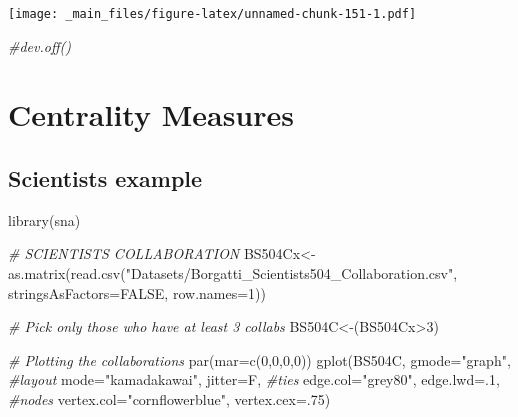 \documentclass[
  notitlepage,
  onecolumn,
  openany]{book}
\newenvironment{Shaded}{\begin{snugshade}}{\end{snugshade}}
\newcommand{\AttributeTok}[1]{\textcolor[rgb]{0.77,0.63,0.00}{#1}}
\newcommand{\CommentTok}[1]{\textcolor[rgb]{0.56,0.35,0.01}{\textit{#1}}}
\newcommand{\ConstantTok}[1]{\textcolor[rgb]{0.00,0.00,0.00}{#1}}
\newcommand{\DecValTok}[1]{\textcolor[rgb]{0.00,0.00,0.81}{#1}}
\newcommand{\FunctionTok}[1]{\textcolor[rgb]{0.00,0.00,0.00}{#1}}
\newcommand{\NormalTok}[1]{#1}
\newcommand{\OtherTok}[1]{\textcolor[rgb]{0.56,0.35,0.01}{#1}}
\newcommand{\SpecialCharTok}[1]{\textcolor[rgb]{0.00,0.00,0.00}{#1}}
\newcommand{\StringTok}[1]{\textcolor[rgb]{0.31,0.60,0.02}{#1}}
\begin{document}
\texttt{[image: \_main\_files/figure-latex/unnamed-chunk-151-1.pdf]}

\begin{Shaded}
\begin{Highlighting}[]
\CommentTok{\#dev.off()}
\end{Highlighting}
\end{Shaded}

\hypertarget{centrality-measures}{%
\chapter{Centrality Measures}\label{centrality-measures}}

\hypertarget{scientists-example}{%
\section{Scientists example}\label{scientists-example}}

\begin{Shaded}
\begin{Highlighting}[]
\FunctionTok{library}\NormalTok{(sna)}

\CommentTok{\# SCIENTISTS COLLABORATION}
\NormalTok{BS504Cx}\OtherTok{\textless{}{-}}\FunctionTok{as.matrix}\NormalTok{(}\FunctionTok{read.csv}\NormalTok{(}\StringTok{"Datasets/Borgatti\_Scientists504\_Collaboration.csv"}\NormalTok{,}
                            \AttributeTok{stringsAsFactors=}\ConstantTok{FALSE}\NormalTok{, }\AttributeTok{row.names=}\DecValTok{1}\NormalTok{))}

\CommentTok{\# Pick only those who have at least 3 collabs}
\NormalTok{BS504C}\OtherTok{\textless{}{-}}\NormalTok{(BS504Cx}\SpecialCharTok{\textgreater{}}\DecValTok{3}\NormalTok{)}

\CommentTok{\# Plotting the collaborations}
\FunctionTok{par}\NormalTok{(}\AttributeTok{mar=}\FunctionTok{c}\NormalTok{(}\DecValTok{0}\NormalTok{,}\DecValTok{0}\NormalTok{,}\DecValTok{0}\NormalTok{,}\DecValTok{0}\NormalTok{))}
\FunctionTok{gplot}\NormalTok{(BS504C, }
      \AttributeTok{gmode=}\StringTok{"graph"}\NormalTok{,}
      \CommentTok{\#layout}
      \AttributeTok{mode=}\StringTok{"kamadakawai"}\NormalTok{,}
      \AttributeTok{jitter=}\NormalTok{F,}
      \CommentTok{\#ties}
      \AttributeTok{edge.col=}\StringTok{"grey80"}\NormalTok{, }
      \AttributeTok{edge.lwd=}\NormalTok{.}\DecValTok{1}\NormalTok{,}
      \CommentTok{\#nodes}
      \AttributeTok{vertex.col=}\StringTok{"cornflowerblue"}\NormalTok{,}
      \AttributeTok{vertex.cex=}\NormalTok{.}\DecValTok{75}\NormalTok{)}
\end{Highlighting}
\end{Shaded}
\end{document}
